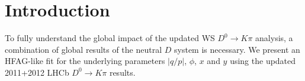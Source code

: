 
\section{Introduction}
\label{sec:Introduction}
To fully understand the global impact of the updated WS $D^0\to K\pi$ analysis, 
a combination of global results of the neutral $D$ system is necessary. We present
an HFAG-like fit for the underlying parameters $|q/p|$, $\phi$, $x$ and $y$ using
the updated 2011+2012 LHCb $D^0\to K\pi$ results.
